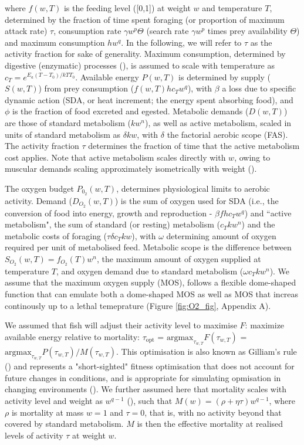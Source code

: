 \documentclass[a4paper, toc=index,abstract=true]{scrartcl}\usepackage[]{graphicx}\usepackage[]{color}
\begin{document}
\begin{spacing}{1.9}
where $f(w,T)$ is the feeding level ([0,1]) at weight $w$ and temperature $T$, determined by the fraction of time spent foraging (or proportion of maximum attack rate) $\tau$, consumption rate $\gamma w^p \Theta$ (search rate $\gamma w^p$ times prey availability $\Theta$) and maximum consumption $h w^q$. In the following, we will refer to $\tau$ as the activity fraction for sake of generality. Maximum consumption, determined by digestive (enzymatic) processes (\cite{jeschke_predator_2002, sentis_parsing_2013}), is assumed to scale with temperature as $c_T = e^{E_a(T-T_0)/kTT_0}$. Available energy $P(w,T)$ is determined by supply ($S(w,T)$) from prey consumption ($f(w,T) h c_T w^q$), with $\beta$ a loss due to specific dynamic action (SDA, or heat increment; the energy spent absorbing food), and $\phi$ is the fraction of food excreted and egested. Metabolic demands ($D(w,T)$) are those of standard metabolism ($k w^n$), as well as active metabolism, scaled in units of standard metabolism as $\delta k w$, with $\delta$ the factorial aerobic scope (FAS). The activity fraction $\tau$ determines the fraction of time that the active metabolism cost applies. Note that active metabolism scales directly with $w$, owing to muscular demands scaling approximately isometrically with weight (\cite{glazier_activity_2009,brett1965relation}). 

The oxygen budget $P_{0_2}(w,T)$, determines physiological limits to aerobic activity. Demand ($D_{O_2}(w,T)$) is the sum of oxygen used for SDA (i.e., the conversion of food into energy, growth and reproduction - $\beta f h c_T w^q$) and ``active metabolism", the sum of standard (or resting) metabolism ($c_T k w^n$) and the metabolic costs of foraging ($\tau \delta c_T k w$), with $\omega$ determining amount of oxygen required per unit of metabolised feed. Metabolic scope is the difference between $S_{O_2}(w,T)=f_{O_2}(T)w^n$, the maximum amount of oxygen supplied at temperature $T$, and oxygen demand due to standard metabolism ($\omega c_T k w^n$). We assume that the maximum oxygen supply (MOS), follows a flexible dome-shaped function that can emulate both a dome-shaped MOS as well as MOS that increas continously up to a lethal temeprature (Figure \ref{fig:O2_fig}, Appendix A).

We assumed that fish will adjust their activity level to maximise $F$: maximize available energy relative to mortality: $\tau_{\text{opt}}$ = $\text{argmax}_{\tau_{w,T}}F(\tau_{w,T})$ = $\text{argmax}_{\tau_{w,T}}P(\tau_{w,T})/M(\tau_{w,T})$. This optimisation is also known as Gilliam's rule (\cite{gilliam_habitat_1987}) and represents a "short-sighted" fitness optimisation that does not account for future changes in conditions, and is appropriate for simulating opmisation in changing environments (\cite{sainmont_effective_2015}). We further assumed here that mortality scales with activity level and weight as $w^{q-1}$ (\cite{andersen_how_2009, hartvig_food_2011}), such that $M(w) = (\rho+\eta\tau) w^{q-1}$, where $ \rho$ is mortality at mass $w=1$ and $\tau=0$, that is, with no activity beyond that covered by standard metabolism. $M$ is then the effective mortality at realised levels of activity $\tau$ at weight $w$.


\end{spacing}
\end{document}
